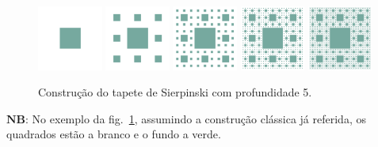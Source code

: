 \documentclass[a4paper]{article}
\begin{document}
\begin{figure}[h!]
  \centering
  \includegraphics[width=0.19\textwidth]{cp2223t_media/tapete1.png}
  \includegraphics[width=0.19\textwidth]{cp2223t_media/tapete2.png}
  \includegraphics[width=0.19\textwidth]{cp2223t_media/tapete3.png}
  \includegraphics[width=0.19\textwidth]{cp2223t_media/tapete4.png}
  \includegraphics[width=0.19\textwidth]{cp2223t_media/tapete5.png}
  \caption{Construção do tapete de Sierpinski com profundidade 5.}
  \label{fig:sierp1}
\end{figure}

\noindent
\ensuremath{\textbf{NB}}: No exemplo da fig.~\ref{fig:sierp1}, assumindo a construção clássica já referida, os quadrados estão a branco e o fundo a verde.
\end{document}
